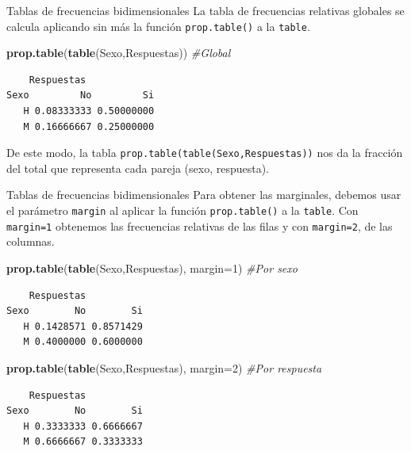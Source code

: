 \documentclass[
  ignorenonframetext,
]{beamer}
\newenvironment{Shaded}{\begin{snugshade}}{\end{snugshade}}
\newcommand{\AttributeTok}[1]{\textcolor[rgb]{0.13,0.29,0.53}{#1}}
\newcommand{\CommentTok}[1]{\textcolor[rgb]{0.56,0.35,0.01}{\textit{#1}}}
\newcommand{\DecValTok}[1]{\textcolor[rgb]{0.00,0.00,0.81}{#1}}
\newcommand{\FunctionTok}[1]{\textcolor[rgb]{0.13,0.29,0.53}{\textbf{#1}}}
\newcommand{\NormalTok}[1]{#1}
\begin{document}
\begin{frame}[fragile]{Tablas de frecuencias bidimensionales}
\label{tablas-de-frecuencias-bidimensionales-5}
La tabla de frecuencias relativas globales se calcula aplicando sin más
la función \texttt{prop.table()} a la \texttt{table}.

\begin{Shaded}
\begin{Highlighting}[]
\FunctionTok{prop.table}\NormalTok{(}\FunctionTok{table}\NormalTok{(Sexo,Respuestas)) }\CommentTok{\#Global}
\end{Highlighting}
\end{Shaded}

\begin{verbatim}
    Respuestas
Sexo         No         Si
   H 0.08333333 0.50000000
   M 0.16666667 0.25000000
\end{verbatim}

De este modo, la tabla \texttt{prop.table(table(Sexo,Respuestas))} nos
da la fracción del total que representa cada pareja (sexo, respuesta).
\end{frame}

\begin{frame}[fragile]{Tablas de frecuencias bidimensionales}
\label{tablas-de-frecuencias-bidimensionales-6}
Para obtener las marginales, debemos usar el parámetro \texttt{margin}
al aplicar la función \texttt{prop.table()} a la \texttt{table}. Con
\texttt{margin=1} obtenemos las frecuencias relativas de las filas y con
\texttt{margin=2}, de las columnas.

\begin{Shaded}
\begin{Highlighting}[]
\FunctionTok{prop.table}\NormalTok{(}\FunctionTok{table}\NormalTok{(Sexo,Respuestas), }\AttributeTok{margin=}\DecValTok{1}\NormalTok{) }\CommentTok{\#Por sexo}
\end{Highlighting}
\end{Shaded}

\begin{verbatim}
    Respuestas
Sexo        No        Si
   H 0.1428571 0.8571429
   M 0.4000000 0.6000000
\end{verbatim}

\begin{Shaded}
\begin{Highlighting}[]
\FunctionTok{prop.table}\NormalTok{(}\FunctionTok{table}\NormalTok{(Sexo,Respuestas), }\AttributeTok{margin=}\DecValTok{2}\NormalTok{) }\CommentTok{\#Por respuesta}
\end{Highlighting}
\end{Shaded}

\begin{verbatim}
    Respuestas
Sexo        No        Si
   H 0.3333333 0.6666667
   M 0.6666667 0.3333333
\end{verbatim}
\end{frame}
\end{document}
